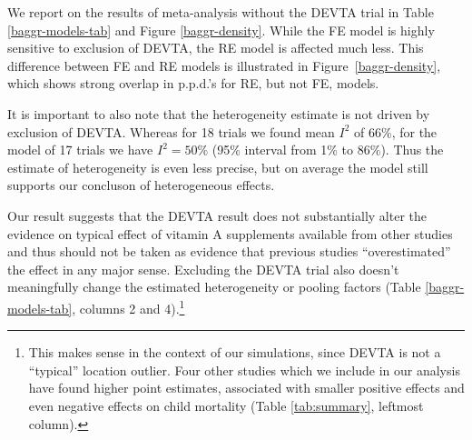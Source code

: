 \documentclass[12pt]{article}
\begin{document}
We report on the results of meta-analysis without the DEVTA trial in Table \ref{baggr-models-tab} and Figure \ref{baggr-density}. While the FE model is highly sensitive to exclusion of DEVTA, the RE model is affected much less. This difference between FE and RE models is illustrated in Figure~\ref{baggr-density}, which shows strong overlap in p.p.d.'s for RE, but not FE, models.

It is important to also note that the heterogeneity estimate is not driven by exclusion of DEVTA. Whereas for 18 trials we found mean $I^2$ of 66\%, for the model of 17 trials we have $I^2 = 50\%$ (95\% interval from 1\% to 86\%). Thus the estimate of heterogeneity is even less precise, but on average the model still supports our concluson of heterogeneous effects.

Our result suggests that the DEVTA result does not substantially alter the evidence on typical effect of vitamin A supplements available from other studies and thus should not be taken as evidence that previous studies ``overestimated'' the effect in any major sense. Excluding the DEVTA trial also doesn't meaningfully change the estimated heterogeneity or pooling factors (Table \ref{baggr-models-tab}, columns 2 and 4).\footnote{This makes sense in the context of our simulations, since DEVTA is not a ``typical'' location outlier. Four other studies which we include in our analysis have found higher point estimates, associated with smaller positive effects and even negative effects on child mortality (Table \ref{tab:summary}, leftmost column).}


\end{document}
